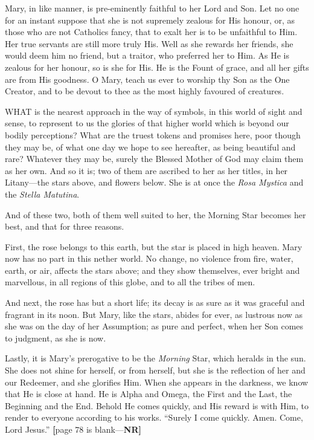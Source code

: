Mary, in like manner, is
pre-eminently faithful to her Lord and Son. Let no one for an instant
suppose that she is not supremely zealous for His honour, or, as those
who are not Catholics fancy, that to exalt her is to be unfaithful to
Him. Her true servants are still more truly His. Well as she rewards her
friends, she would deem him no friend, but a traitor, who preferred her
to Him. As He is zealous for her honour, so is she for His. He is the
Fount of grace, and all her gifts are from His goodness. O Mary, teach
us ever to worship thy Son as the One Creator, and to be devout to thee
as the most highly favoured of creatures.



WHAT
is the nearest approach in the way of symbols, in this world of sight
and sense, to represent to us the glories of that higher world which is
beyond our bodily perceptions? What are the truest tokens and promises
here, poor though they may be, of what one day we hope to see hereafter,
as being beautiful and rare? Whatever they may be, surely the Blessed
Mother of God may claim them as her own. And so it is; two of them are
ascribed to her as her titles, in her Litany—the stars above, and
flowers below. She is at once the \emph{Rosa Mystica} and the \emph{Stella
Matutina}.

And of these two, both of them
well suited to her, the Morning Star becomes her best, and that for
three reasons.

First, the rose belongs to this
earth, but the star is placed in high heaven. Mary now has no part in
this nether world. No change, no violence from fire, water, earth,
or air, affects the stars above; and they show themselves, ever bright
and marvellous, in all regions of this globe, and to all the tribes of
men.

And next, the rose has but a
short life; its decay is as sure as it was graceful and fragrant in its
noon. But Mary, like the stars, abides for ever, as lustrous now as she
was on the day of her Assumption; as pure and perfect, when her Son
comes to judgment, as she is now.

Lastly, it is Mary's prerogative
to be the \emph{Morning} Star, which heralds in the sun. She does not
shine for herself, or from herself, but she is the reflection of her and
our Redeemer, and she glorifies Him. When she appears in the darkness,
we know that He is close at hand. He is Alpha and Omega, the First and
the Last, the Beginning and the End. Behold He comes quickly, and His
reward is with Him, to render to everyone according to his works. ``Surely
I come quickly. Amen. Come, Lord Jesus.'' \textbf{[}page
78 is blank—\textbf{NR]}

